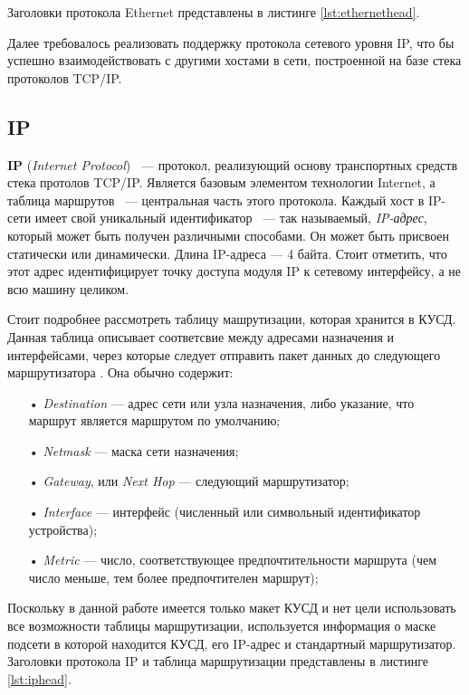 Заголовки протокола Ethernet представлены в листинге \ref{lst:ethernethead}. 

{\small{}}

Далее требовалось реализовать поддержку протокола сетевого уровня IP, что бы успешно взаимодействовать с другими хостами в сети, построенной на базе стека протоколов TCP/IP.

\subsection{IP}

\textbf{IP} (\textit{Internet Protocol}) ~--- протокол, реализующий основу транспортных средств стека протолов TCP/IP. Является базовым элементом технологии Internet, а таблица маршрутов ~--- центральная часть этого протокола. Каждый хост в IP-сети имеет свой уникальный идентификатор ~--- так называемый, \textit{IP-адрес}, который может быть получен различными способами. Он может быть присвоен статически или динамически. Длина IP-адреса --- 4 байта. Стоит отметить, что этот адрес идентифицирует точку доступа модуля IP к сетевому интерфейсу, а не всю машину целиком.

Стоит подробнее рассмотреть таблицу машрутизации, которая хранится в КУСД. Данная таблица описывает соответсвие между адресами назначения и интерфейсами, через которые следует отправить пакет данных до следующего маршрутизатора \cite{ip}. Она обычно содержит:
\begin{itemize}
	\item[•] \textit{Destination} --- адрес сети или узла назначения, либо указание, что маршрут является маршрутом по умолчанию;
	\item[•] \textit{Netmask} --- маска сети назначения;
	\item[•] \textit{Gateway}, или \textit{Next Hop} --- следующий маршрутизатор;
	\item[•] \textit{Interface} --- интерфейс (численный или символьный идентификатор устройства);
	\item[•] \textit{Metric} --- число, соответствующее предпочтительности маршрута (чем число меньше, тем более предпочтителен маршрут);
\end{itemize}

Поскольку в данной работе имеется только макет КУСД и нет цели использовать все возможности таблицы маршрутизации, используется информация о маске подсети в которой находится КУСД, его IP-адрес и стандартный маршрутизатор. Заголовки протокола IP и таблица маршрутизации представлены в листинге \ref{lst:iphead}.

